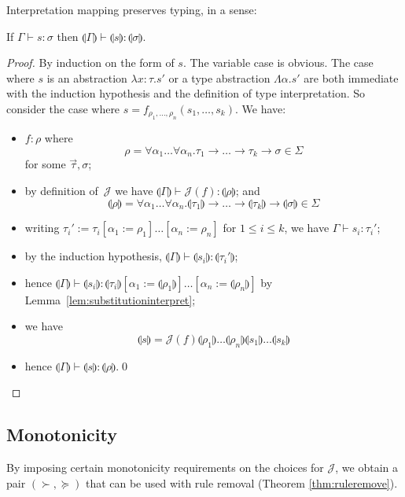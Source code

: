 \documentclass[runningheads,a4paper]{llncs}
\newcommand{\Termmap}{\mathcal{J}}
\newcommand{\typeinterpret}[1]{\llparenthesis #1 \rrparenthesis}
\newcommand{\interpret}[1]{\llparenthesis #1 \rrparenthesis}
\newcommand{\itp}[1]{\llparenthesis #1 \rrparenthesis}
\newcommand{\arrtype}{\rightarrow}
\newcommand{\abs}[2]{\lambda #1.#2}
\newcommand{\tabs}[2]{\Lambda #1.#2}
\begin{document}
Interpretation mapping preserves typing, in a sense:

\begin{lemma}
If $\Gamma \vdash s : \sigma$ then $\itp{\Gamma} \vdash \interpret{s}
: \typeinterpret{\sigma}$.
\end{lemma}

\begin{proof}
By induction on the form of $s$.  The variable case is obvious. The
case where $s$ is an abstraction $\abs{x:\tau}{s'}$ or a type
abstraction $\tabs{\alpha}{s'}$ are both immediate with the induction
hypothesis and the definition of type interpretation.  So consider the
case where $s = f_{\rho_1,\dots,\rho_n}(s_1,\dots,s_k)$. We have:
\begin{itemize}
\item $f : \rho$ where
  \[
  \rho = \forall \alpha_1 \ldots \forall \alpha_n . \tau_1 \arrtype
  \dots \arrtype \tau_k \arrtype \sigma \in \Sigma
  \]
  for some $\vec{\tau},\sigma$;
\item by definition of~$\Termmap$ we have $\itp{\Gamma} \vdash
  \Termmap(f) : \typeinterpret{\rho}$; and
  \[
  \typeinterpret{\rho} = \forall \alpha_1 \ldots \forall \alpha_n
  . \typeinterpret{\tau_1} \arrtype \dots \arrtype
  \typeinterpret{\tau_k} \arrtype \typeinterpret{\sigma} \in \Sigma
  \]
\item writing $\tau_i' := \tau_i[\alpha_1:=\rho_1]\dots[\alpha_n:=
  \rho_n]$ for $1 \leq i \leq k$, we have $\Gamma \vdash s_i :
  \tau_i'$;
\item by the induction hypothesis, $\itp{\Gamma} \vdash
  \interpret{s_i} : \typeinterpret{\tau_i'}$;
\item hence $\itp{\Gamma} \vdash \interpret{s_i} :
  \typeinterpret{\tau_i}[\alpha_1:=\typeinterpret{\rho_1}]\ldots[\alpha_n:=\typeinterpret{\rho_n}]$
  by Lemma~\ref{lem:substitutioninterpret};
\item we have
  \[
  \interpret{s} = \Termmap(f) \typeinterpret{\rho_1} \ldots
  \typeinterpret{\rho_n} \interpret{s_1} \ldots \interpret{s_k}
  \]
\item hence $\itp{\Gamma} \vdash \interpret{s} :
  \typeinterpret{\rho}$.\qed
\end{itemize}
\end{proof}

\subsection{Monotonicity}

By imposing certain monotonicity requirements on the choices for
$\Termmap$, we obtain a pair $(\succ,\succeq)$ that can be used with
rule removal (Theorem \ref{thm:ruleremove}).
\end{document}
